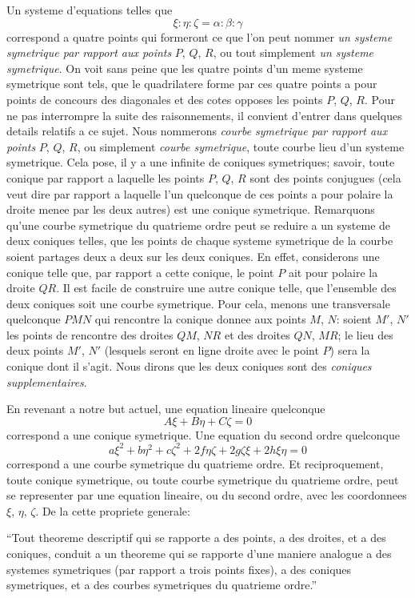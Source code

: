 \documentclass[12pt,a4paper]{article}
\begin{document}
Un systeme d'equations telles que
\[
\xi : \eta : \zeta = \alpha : \beta : \gamma
\]
correspond a quatre points qui formeront ce que l'on peut nommer \textit{un systeme symetrique par rapport aux points} $P$, $Q$, $R$, ou tout simplement \textit{un systeme symetrique}. On voit sans peine que les quatre points d'un meme systeme symetrique sont tels, que le quadrilatere forme par ces quatre points a pour points de concours des diagonales et des cotes opposes les points $P$, $Q$, $R$. Pour ne pas interrompre la suite des raisonnements, il convient d'entrer dans quelques details relatifs a ce sujet. Nous nommerons \textit{courbe symetrique par rapport aux points} $P$, $Q$, $R$, ou simplement \textit{courbe symetrique}, toute courbe lieu d'un systeme symetrique. Cela pose, il y a une infinite de coniques symetriques; savoir, toute conique par rapport a laquelle les points $P$, $Q$, $R$ sont des points conjugues (cela veut dire par rapport a laquelle l'un quelconque de ces points a pour polaire la droite menee par les deux autres) est une conique symetrique. Remarquons qu'une courbe symetrique du quatrieme ordre peut se reduire a un systeme de deux coniques telles, que les points de chaque systeme symetrique de la courbe soient partages deux a deux sur les deux coniques. En effet, considerons une conique telle que, par rapport a cette conique, le point $P$ ait pour polaire la droite $QR$. Il est facile de construire une autre conique telle, que l'ensemble des deux coniques soit une courbe symetrique. Pour cela, menons une transversale quelconque $PMN$ qui rencontre la conique donnee aux points $M$, $N$: soient $M'$, $N'$ les points de rencontre des droites $QM$, $NR$ et des droites $QN$, $MR$; le lieu des deux points $M'$, $N'$ (lesquels seront en ligne droite avec le point $P$) sera la conique dont il s'agit. Nous dirons que les deux coniques sont des \textit{coniques supplementaires}.

En revenant a notre but actuel, une equation lineaire quelconque
\[
A\xi + B\eta + C\zeta = 0
\]
correspond a une conique symetrique. Une equation du second ordre quelconque
\[
a\xi^2 + b\eta^2 + c\zeta^2 + 2f\eta\zeta + 2g\zeta\xi + 2h\xi\eta = 0
\]
correspond a une courbe symetrique du quatrieme ordre. Et reciproquement, toute conique symetrique, ou toute courbe symetrique du quatrieme ordre, peut se representer par une equation lineaire, ou du second ordre, avec les coordonnees $\xi$, $\eta$, $\zeta$. De la cette propriete generale:

``Tout theoreme descriptif qui se rapporte a des points, a des droites, et a des coniques, conduit a un theoreme qui se rapporte d'une maniere analogue a des systemes symetriques (par rapport a trois points fixes), a des coniques symetriques, et a des courbes symetriques du quatrieme ordre.''
\end{document}

